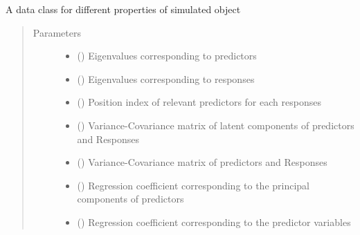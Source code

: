 \documentclass[letterpaper,10pt,english]{sphinxmanual}
\begin{document}

\begin{fulllineitems}
\label{\detokenize{Classes:pysimrel.Properties}}
A data class for different properties of simulated object
\begin{quote}\begin{description}
\item[{Parameters}] \leavevmode\begin{itemize}
\item {} 
 () \textendash{} Eigenvalues corresponding to predictors

\item {} 
 () \textendash{} Eigenvalues corresponding to responses

\item {} 
 () \textendash{} Position index of relevant predictors for each responses

\item {} 
 () \textendash{} Variance-Covariance matrix of latent components of predictors and Responses

\item {} 
 () \textendash{} Variance-Covariance matrix of predictors and Responses

\item {} 
 () \textendash{} Regression coefficient corresponding to the principal components of predictors

\item {} 
 () \textendash{} Regression coefficient corresponding to the predictor variables


\end{itemize}
\end{description}
\end{quote}
\end{fulllineitems}
\end{document}
